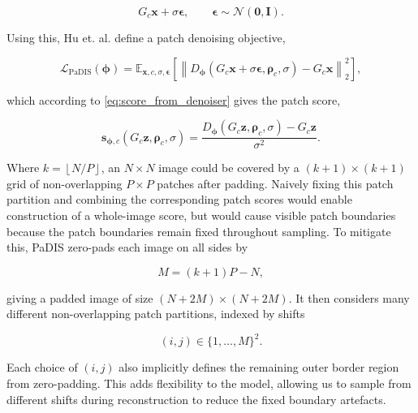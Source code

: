 \begin{equation}
G_c\mathbf{x}+\sigma\boldsymbol{\epsilon},
\qquad
\boldsymbol{\epsilon}\sim\mathcal{N}(\mathbf{0},\mathbf{I}).
\label{eq:noisy_patch}
\end{equation}

Using this, Hu et. al. define a patch denoising objective,

\begin{equation}
\mathcal L_{\mathrm{PaDIS}}(\boldsymbol{\phi})
=
\mathbb E_{\mathbf{x},c,\sigma,\boldsymbol{\epsilon}}
\left[
\left\|
D_{\boldsymbol{\phi}}(G_c\mathbf{x}+\sigma\boldsymbol{\epsilon},\boldsymbol{\rho}_c,\sigma)
-
G_c\mathbf{x}
\right\|_2^2
\right],
\label{eq:padis_denoising_objective}
\end{equation}

which according to \eqref{eq:score_from_denoiser} gives the patch score,

\begin{equation}
\mathbf{s}_{\boldsymbol{\phi},c}(G_c\mathbf{z},\boldsymbol{\rho}_c,\sigma)
=
\frac{
D_{\boldsymbol{\phi}}(G_c\mathbf{z},\boldsymbol{\rho}_c,\sigma)
-
G_c\mathbf{z}
}{\sigma^2}.
\label{eq:padis_patch_score}
\end{equation}

Where $k=\left\lfloor N/P \right\rfloor$, an $N\times N$ image could be covered by a $(k+1)\times(k+1)$ grid of non-overlapping $P\times P$ patches after padding. Naively fixing this patch partition and combining the corresponding patch scores would enable construction of a whole-image score, but would cause visible patch boundaries because the patch boundaries remain fixed throughout sampling. To mitigate this, PaDIS zero-pads each image on all sides by

\begin{equation}
M=(k+1)P-N,
\label{eq:padis_padding}
\end{equation}

giving a padded image of size $(N+2M)\times(N+2M)$. It then considers many different non-overlapping patch partitions, indexed by shifts

\begin{equation}
(i,j)\in\{1,\dots,M\}^2.
\label{eq:padis_shifts}
\end{equation}

Each choice of $(i,j)$ also implicitly defines the remaining outer border region from zero-padding. This adds flexibility to the model, allowing us to sample from different shifts during reconstruction to reduce the fixed boundary artefacts.

